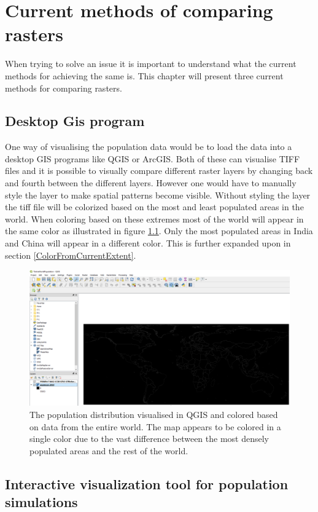 \chapter{Current methods of comparing rasters}\label{CCurrentSolution}

When trying to solve an issue it is important to understand what the current methods for achieving the same is. This chapter will present three current methods for comparing rasters.

\section{Desktop Gis program}

One way of visualising the population data would be to load the data into a desktop GIS programs like QGIS or ArcGIS. Both of these can visualise TIFF files and it is possible to visually compare different raster layers by changing back and fourth between the different layers. However one would have to manually style the layer to make spatial patterns become visible. Without styling the layer the tiff file will be colorized based on the most and least populated areas in the world. When coloring based on these extremes most of the world will appear in the same color as illustrated in figure \ref{QGIS}. Only the most populated areas in India and China will appear in a different color. This is further expanded upon in section \ref{ColorFromCurrentExtent}.

\begin{figure} [H]
	\centering
	\includegraphics[width=.8\textwidth]{Pictures/QGIS}
	\caption{The population distribution visualised in QGIS and colored based on data from the entire world. The map appears to be colored in a single color due to the vast difference between the most densely populated areas and the rest of the world.}
	\label{QGIS}
\end{figure}

\section{Interactive visualization tool for population simulations}

